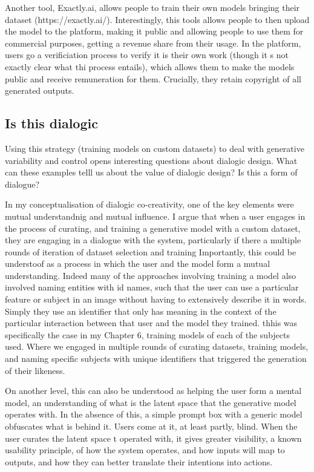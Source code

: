 Another tool, Exactly.ai, allows people to train their own models bringing their dataset (https://exactly.ai/). Interestingly, this tools allows people to then  upload the model to the platform, making it public and allowing people to use them for commercial purposes, getting a revenue share from their usage. In the platform, users go a verificiation process to verify it is their own work (though it s not exactly clear what thi process entails), which allows them to make the models public and receive remuneration for them. Crucially, they retain copyright of all generated outputs. 



\subsection{Is this dialogic}

Using this strategy (training models on custom datasets) to deal with generative variability and control opens interesting questions about dialogic design. What can these examples telll us about the value of dialogic design? Is this a form of dialogue?

In my conceptualisation of dialogic co-creativity, one of the key elements were mutual understandnig and mutual influence. I argue that when a user engages in the process of curating, and training a generative model with a custom dataset, they are engaging in a dialogue with the system, particularly if there a multiple rounds of iteration of dataset selection and training Importantly, this could be understoof as a process in which the user and the model form a mutual understanding. Indeed many of the approaches involving training a model also involved naming entities with id names, such that the user can use a particular feature or subject in an image without having to extensively describe it in words. Simply they use an identifier that only has meaning in the context of the particular interaction between that user and the model they trained. 
thhis was specifically the case in my Chapter 6, training models of each of the subjects used. Where we engaged in multiple rounds of curating datasets, training models, and naming specific subjects with unique identifiers that triggered the generation of their likeness. 

On another level, this can also be understood as helping the user form a mental model, an understanding of what is the latent space that the generative model operates with. In the absence of this, a simple prompt box with a generic model obfuscates what is behind it. Users come at it, at least partly, blind. When the user curates the latent space t operated with, it gives greater visibility, a known usability principle, of how  the system operates, and how inputs will map to outputs, and how they can better translate their intentions into actions. 

